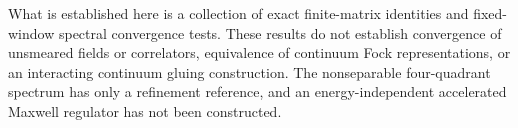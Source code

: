 What is established here is a collection of exact finite-matrix identities and fixed-window spectral convergence tests. These results do not establish convergence of unsmeared fields or correlators, equivalence of continuum Fock representations, or an interacting continuum gluing construction. The nonseparable four-quadrant spectrum has only a refinement reference, and an energy-independent accelerated Maxwell regulator has not been constructed.
